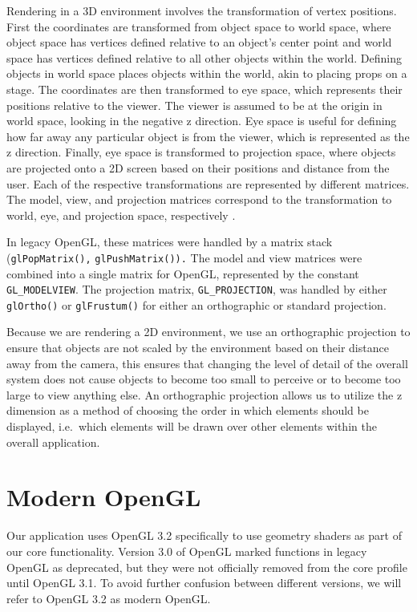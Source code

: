 Rendering in a 3D environment involves the transformation of vertex positions. First the coordinates 
are transformed from object space to world space, where object space has vertices defined relative 
to an object's center point and world space has vertices defined relative to all other objects 
within the world. Defining objects in world space places objects within the world, akin to placing props on a stage. The coordinates are then transformed to eye space, which represents their 
positions relative to the viewer. The viewer is assumed to be at the origin in world space, looking in the negative z direction. Eye space is useful for defining how far away any particular object is from the viewer, which is represented as the z direction.  Finally, eye space is transformed  to projection space, where objects are projected onto a 2D screen based on their positions and distance from the user. Each of the respective transformations are represented by different matrices. The model, view, and projection matrices correspond to the transformation to world, eye, and projection space, respectively \cite{opengl_matrix_stack}. 

In legacy OpenGL, these matrices were handled by a matrix stack ({\tt glPopMa\-trix(),} {\tt glPushMatrix()).} 
The model and view matrices were combined into a single matrix for OpenGL, represented by the 
constant {\tt GL\_MODELVIEW\@}. The projection matrix, {\tt GL\_PROJECTION}, was handled by either {\tt glOrtho()} 
or {\tt glFrustum()} for either an orthographic or standard projection.

Because we are rendering a 2D environment, we use an orthographic projection to ensure that 
objects are not scaled by the environment based on their distance away from the camera, this ensures that changing the level of detail of the overall system does not cause objects to become too small to perceive or to become too large to view anything else. An orthographic projection allows us to utilize the z dimension as a method of choosing the order in which elements should be displayed, i.e.\ which elements will be drawn over other elements within the overall application.

\section{Modern OpenGL}
\label{section:modern_opengl}

Our application uses OpenGL 3.2 specifically to use geometry shaders as part of our core functionality. Version 3.0 of OpenGL marked functions in legacy OpenGL as deprecated, but they were not officially removed from the core profile until OpenGL 3.1. To avoid further confusion between different versions, we will refer to OpenGL 3.2 as modern OpenGL.

